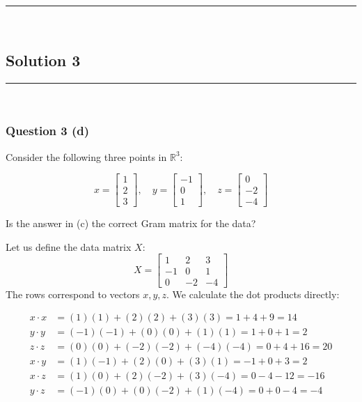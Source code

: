 \documentclass{article}
\begin{document}
\noindent\rule{\textwidth}{0.4pt}\\

\newpage

\subsection*{Solution 3}
\noindent\rule{\textwidth}{0.4pt}\\
\subsubsection*{Question 3 (d)}
\begin{flushleft}
    Consider the following three points in $\mathbb{R}^3$:

\[
x = \begin{bmatrix}1 \\ 2 \\ 3\end{bmatrix}, \quad
y = \begin{bmatrix}-1 \\ 0 \\ 1\end{bmatrix}, \quad
z = \begin{bmatrix}0 \\ -2 \\ -4\end{bmatrix}
\]

\end{flushleft}
\begin{flushleft}

Is the answer in (c) the correct Gram matrix for the data?
    
\end{flushleft}

Let us define the data matrix $X$:
$$ X = \begin{bmatrix} 1 & 2 & 3 \\ -1 & 0 & 1 \\ 0 & -2 & -4 \end{bmatrix} $$
The rows correspond to vectors $x, y, z$. We calculate the dot products directly:

\begin{align*}
    x \cdot x &= (1)(1) + (2)(2) + (3)(3) = 1 + 4 + 9 = 14 \\
    y \cdot y &= (-1)(-1) + (0)(0) + (1)(1) = 1 + 0 + 1 = 2 \\
    z \cdot z &= (0)(0) + (-2)(-2) + (-4)(-4) = 0 + 4 + 16 = 20 \\
    x \cdot y &= (1)(-1) + (2)(0) + (3)(1) = -1 + 0 + 3 = 2 \\
    x \cdot z &= (1)(0) + (2)(-2) + (3)(-4) = 0 - 4 - 12 = -16 \\
    y \cdot z &= (-1)(0) + (0)(-2) + (1)(-4) = 0 + 0 - 4 = -4
\end{align*}
\end{document}

